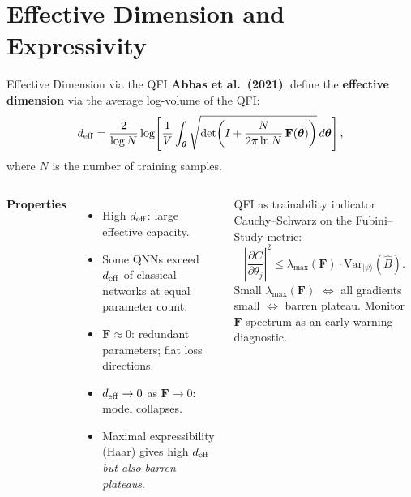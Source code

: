\documentclass[aspectratio=169,10pt]{beamer}
\newcommand{\btheta}{\boldsymbol{\theta}}
\newcommand{\QFI}{\mathbf{F}}
\newcommand{\Variance}{\mathrm{Var}}
\begin{document}
\section{Effective Dimension and Expressivity}

\begin{frame}{Effective Dimension via the QFI}
  \textbf{Abbas et al.\ (2021)}: define the
  \textbf{effective dimension} via the average log-volume
  of the QFI:
  \[
    d_{\rm eff}
    = \frac{2}{\log N}
      \log\!\left[\frac{1}{V}\int_{\btheta}
        \sqrt{\det\!\left(
          I + \frac{N}{2\pi\ln N}\,\QFI(\btheta)
        \right)}\,d\btheta\right],
  \]
  where $N$ is the number of training samples.

  \begin{columns}[T]
    \textbf{Properties}
    \begin{itemize}\itemsep1pt
      \item High $d_{\rm eff}$: large effective capacity.
      \item Some QNNs exceed $d_{\rm eff}$ of classical
            networks at equal parameter count.
      \item $\QFI\approx 0$: redundant parameters;
            flat loss directions.
      \item $d_{\rm eff}\to 0$ as $\QFI\to 0$: model
            collapses.
      \item Maximal expressibility (Haar) gives high
            $d_{\rm eff}$ \emph{but also barren plateaus}.
    \end{itemize}
    \begin{block}{QFI as trainability indicator}
      Cauchy--Schwarz on the Fubini--Study metric:
      \[
        \left|\frac{\partial C}{\partial\theta_j}\right|^2
        \leq
        \lambda_{\max}(\QFI)
        \cdot
        \Variance_{|\psi\rangle}(\hat{B}).
      \]
      Small $\lambda_{\max}(\QFI)$
      $\Leftrightarrow$ all gradients small
      $\Leftrightarrow$ barren plateau.
      Monitor $\QFI$ spectrum as an early-warning diagnostic.
    \end{block}
  \end{columns}
\end{frame}
\end{document}
